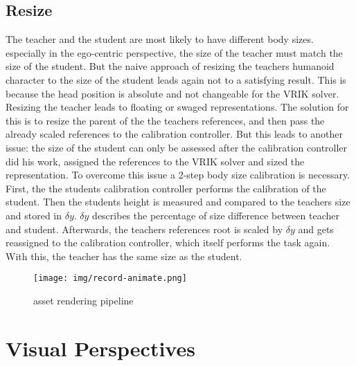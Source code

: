 \subsection{Resize}
The teacher and the student are most likely to have different body sizes. especially in the ego-centric perspective, the size of the teacher must match the size of the student. But the naive approach of resizing the teachers humanoid character to the size of the student leads again not to a satisfying result. This is because the head position is absolute and not changeable for the VRIK solver. Resizing the teacher leads to floating or swaged representations. The solution for this is to resize the parent of the the teachers references, and then pass the already scaled references to the calibration controller. But this leads to another issue: the size of the student can only be assessed after the calibration controller did his work, assigned the references to the VRIK solver and sized the representation. To overcome this issue a 2-step body size calibration is necessary. First, the the students calibration controller performs the calibration of the student. Then the students height is measured and compared to the teachers size and stored in $\delta y$. $\delta y$ describes the percentage of size difference between teacher and student. Afterwards, the teachers references root is scaled by $\delta y$ and gets reassigned to the calibration controller, which itself performs the task again. With this, the teacher has the same size as the student.

\begin{figure}
	\centering
	\texttt{[image: img/record-animate.png]}
	\caption{asset rendering pipeline}
	\label{fig:record-animate}
\end{figure}
\section{Visual Perspectives}
